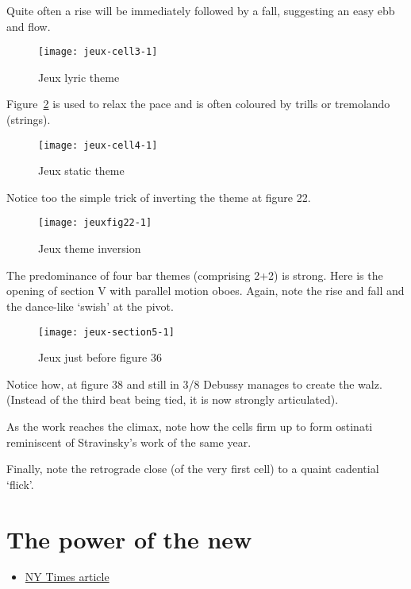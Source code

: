 Quite often a rise will be immediately followed by a fall, suggesting an easy ebb and flow.

\begin{figure}[H]
\centering
\texttt{[image: jeux-cell3-1]}\caption{Jeux lyric theme}
\label{fig:jeux3}
\end{figure}

Figure~\ref{fig:jeux4} is used to relax the pace and is often coloured by trills or tremolando (strings).

\begin{figure}[H]
\centering
\texttt{[image: jeux-cell4-1]}\caption{Jeux static theme}
\label{fig:jeux4}
\end{figure}

Notice too the simple trick of inverting the theme at figure 22. 

\begin{figure}[H]
\centering
\texttt{[image: jeuxfig22-1]}\caption{Jeux theme inversion}
\label{fig:jeuxthemeinvert}
\end{figure}

The predominance of four bar themes (comprising 2+2) is strong. Here is the opening of section V with parallel motion oboes. Again, note the rise and fall and the dance-like `swish' at the pivot. 

\begin{figure}[H]
\centering
\texttt{[image: jeux-section5-1]}\caption{Jeux just before figure 36}
\label{fig:jeuxoboe}
\end{figure}

Notice how, at figure 38 and still in 3/8 Debussy manages to create the walz. (Instead of the third beat being tied, it is now strongly articulated).    

As the work reaches the climax, note how the cells firm up to form ostinati reminiscent of Stravinsky's work of the same year. 

Finally, note the retrograde close (of the very first cell) to a quaint cadential `flick'. 


\section{The power of the new}
\begin{itemize}
\item \href{http://www.nytimes.com/2012/09/19/arts/music/radical-music-sometimes-shocking-sometimes-subtle.html?pagewanted=all&_r=0}{NY Times article}
\end{itemize}

